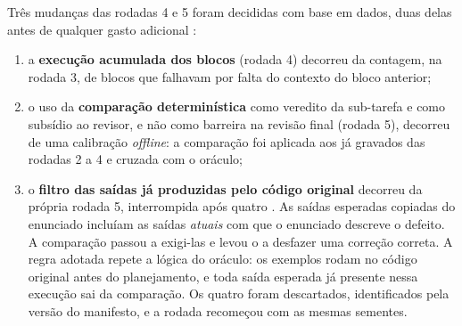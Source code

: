 Três mudanças das rodadas 4 e 5 foram decididas com base em dados, duas delas antes de qualquer gasto adicional :

\begin{enumerate}
    \item a \textbf{execução acumulada dos blocos} (rodada 4) decorreu da contagem, na rodada 3, de blocos que falhavam por falta do contexto do bloco anterior;
    \item o uso da \textbf{comparação determinística} como veredito da sub-tarefa e como subsídio ao revisor, e não como barreira na revisão final (rodada 5), decorreu de uma calibração \textit{offline}: a comparação foi aplicada aos  já gravados das rodadas 2 a 4 e cruzada com o oráculo;
    \item o \textbf{filtro das saídas já produzidas pelo código original} decorreu da própria rodada 5, interrompida após quatro . As saídas esperadas copiadas do enunciado incluíam as saídas \textit{atuais} com que o enunciado descreve o defeito. A comparação passou a exigi-las e levou o  a desfazer uma correção correta. A regra adotada repete a lógica do oráculo: os exemplos rodam no código original antes do planejamento, e toda saída esperada já presente nessa execução sai da comparação. Os quatro  foram descartados, identificados pela versão do manifesto, e a rodada recomeçou com as mesmas sementes.
\end{enumerate}

